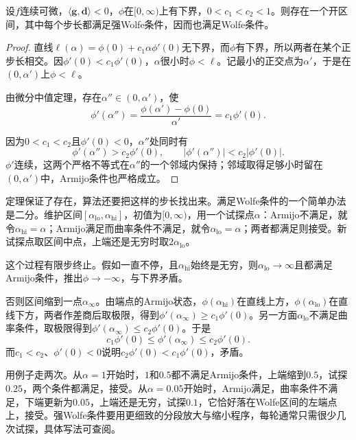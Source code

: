 \begin{theorem}[Wolfe步长的存在]
\label{thm:smooth-wolfe-existence}
设$f$连续可微，$\langle\bm{g},\bm{d}\rangle<0$，$\phi$在$[0,\infty)$上有下界，$0<c_1<c_2<1$。则存在一个开区间，其中每个步长都满足强Wolfe条件，因而也满足Wolfe条件。
\end{theorem}

\begin{proof}
直线$\ell(\alpha)=\phi(0)+c_1\alpha\phi'(0)$无下界，而$\phi$有下界，所以两者在某个正步长相交。因$\phi'(0)<c_1\phi'(0)$，$\alpha$很小时$\phi<\ell$。记最小的正交点为$\alpha'$，于是在$(0,\alpha')$上$\phi<\ell$。

由微分中值定理，存在$\alpha''\in(0,\alpha')$，使
\[
 \phi'(\alpha'')=\frac{\phi(\alpha')-\phi(0)}{\alpha'}=c_1\phi'(0).
\]

因为$0<c_1<c_2$且$\phi'(0)<0$，$\alpha''$处同时有
\[
 \phi'(\alpha'')>c_2\phi'(0),\qquad \lvert\phi'(\alpha'')\rvert<c_2\lvert\phi'(0)\rvert.
\]
$\phi'$连续，这两个严格不等式在$\alpha''$的一个邻域内保持；邻域取得足够小时留在$(0,\alpha')$中，Armijo条件也严格成立。
\end{proof}

定理保证了存在，算法还要把这样的步长找出来。满足Wolfe条件的一个简单办法是二分。维护区间$[\alpha_{\mathrm{lo}},\alpha_{\mathrm{hi}}]$，初值为$[0,\infty)$，用一个试探点$\alpha$：Armijo不满足，就令$\alpha_{\mathrm{hi}}=\alpha$；Armijo满足而曲率条件不满足，就令$\alpha_{\mathrm{lo}}=\alpha$；两者都满足则接受。新试探点取区间中点，上端还是无穷时取$2\alpha_{\mathrm{lo}}$。

这个过程有限步终止。假如一直不停，且$\alpha_{\mathrm{hi}}$始终是无穷，则$\alpha_{\mathrm{lo}}\to\infty$且都满足Armijo条件，推出$\phi\to-\infty$，与下界矛盾。

否则区间缩到一点$\alpha_\infty$。由端点的Armijo状态，$\phi(\alpha_{\mathrm{hi}})$在直线上方，$\phi(\alpha_{\mathrm{lo}})$在直线下方，两者作差商后取极限，得到$\phi'(\alpha_\infty)\geq c_1\phi'(0)$。另一方面$\alpha_{\mathrm{lo}}$不满足曲率条件，取极限得到$\phi'(\alpha_\infty)\leq c_2\phi'(0)$。于是
\[
 c_1\phi'(0)\leq\phi'(\alpha_\infty)\leq c_2\phi'(0).
\]
而$c_1<c_2$、$\phi'(0)<0$说明$c_2\phi'(0)<c_1\phi'(0)$，矛盾。

用例子走两次。从$\alpha=1$开始时，$1$和$0.5$都不满足Armijo条件，上端缩到$0.5$，试探$0.25$，两个条件都满足，接受。从$\alpha=0.05$开始时，Armijo满足，曲率条件不满足，下端更新为$0.05$，上端还是无穷，试探$0.1$，它恰好落在Wolfe区间的左端点上，接受。强Wolfe条件要用更细致的分段放大与缩小程序，每轮通常只需很少几次试探，具体写法可查阅。

